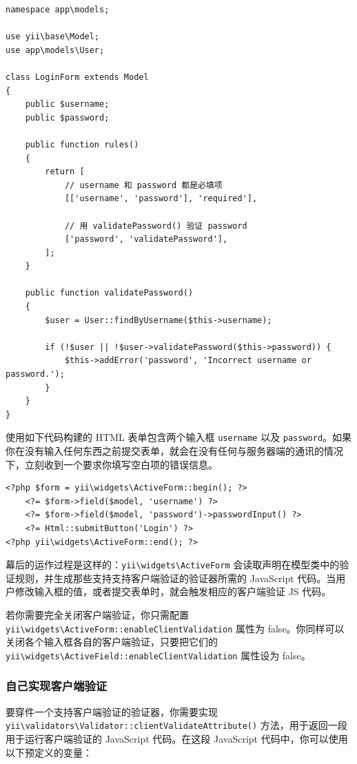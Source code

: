 \lstset{language=php}\begin{lstlisting}
namespace app\models;

use yii\base\Model;
use app\models\User;

class LoginForm extends Model
{
    public $username;
    public $password;

    public function rules()
    {
        return [
            // username 和 password 都是必填项
            [['username', 'password'], 'required'],

            // 用 validatePassword() 验证 password
            ['password', 'validatePassword'],
        ];
    }

    public function validatePassword()
    {
        $user = User::findByUsername($this->username);

        if (!$user || !$user->validatePassword($this->password)) {
            $this->addError('password', 'Incorrect username or password.');
        }
    }
}
\end{lstlisting}
使用如下代码构建的 HTML 表单包含两个输入框 \lstinline|username| 以及 \lstinline|password|。如果你在没有输入任何东西之前提交表单，就会在没有任何与服务器端的通讯的情况下，立刻收到一个要求你填写空白项的错误信息。

\lstset{language=php}\begin{lstlisting}
<?php $form = yii\widgets\ActiveForm::begin(); ?>
    <?= $form->field($model, 'username') ?>
    <?= $form->field($model, 'password')->passwordInput() ?>
    <?= Html::submitButton('Login') ?>
<?php yii\widgets\ActiveForm::end(); ?>
\end{lstlisting}
幕后的运作过程是这样的：\texttt{yii{\allowbreak{}\textbackslash}widgets{\allowbreak{}\textbackslash}ActiveForm} 会读取声明在模型类中的验证规则，并生成那些支持支持客户端验证的验证器所需的 JavaScript 代码。当用户修改输入框的值，或者提交表单时，就会触发相应的客户端验证 JS 代码。

若你需要完全关闭客户端验证，你只需配置 \texttt{yii{\allowbreak{}\textbackslash}widgets{\allowbreak{}\textbackslash}ActiveForm\allowbreak{}::\allowbreak{}enableClientValidation} 属性为 false。你同样可以关闭各个输入框各自的客户端验证，只要把它们的 \texttt{yii{\allowbreak{}\textbackslash}widgets{\allowbreak{}\textbackslash}ActiveField\allowbreak{}::\allowbreak{}enableClientValidation} 属性设为 false。

\subsubsection{自己实现客户端验证 \label{input-validation.md::implementing-client-side-validation}}
要穿件一个支持客户端验证的验证器，你需要实现
\texttt{yii{\allowbreak{}\textbackslash}validators{\allowbreak{}\textbackslash}Validator\allowbreak{}::\allowbreak{}clientValidateAttribute()} 方法，用于返回一段用于运行客户端验证的 JavaScript 代码。在这段 JavaScript 代码中，你可以使用以下预定义的变量：

